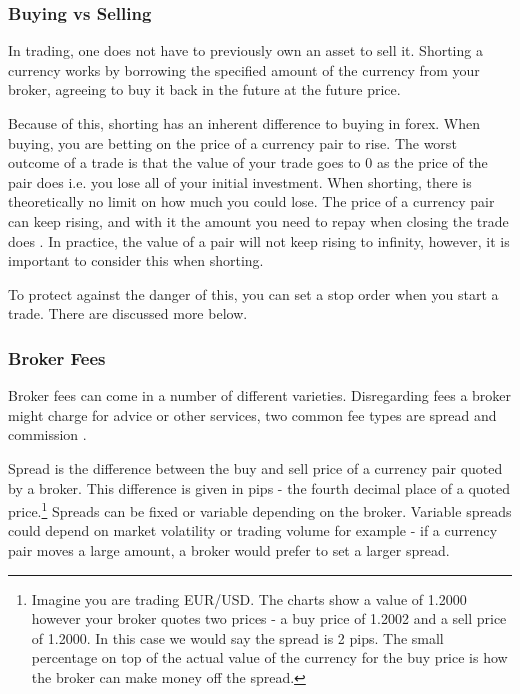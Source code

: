             
            \subsubsection{Buying vs Selling}
            In trading, one does not have to previously own an asset to sell it. Shorting a currency works by borrowing the specified amount of the currency from your broker, agreeing to buy it back in the future at the future price. 
            
            Because of this, shorting has an inherent difference to buying in forex. When buying, you are betting on the price of a currency pair to rise. The worst outcome of a trade is that the value of your trade goes to 0 as the price of the pair does i.e. you lose all of your initial investment. When shorting, there is theoretically no limit on how much you could lose. The price of a currency pair can keep rising, and with it the amount you need to repay when closing the trade does \cite{russell}. In practice, the value of a pair will not keep rising to infinity, however, it is important to consider this when shorting.

            To protect against the danger of this, you can set a stop order when you start a trade. There are discussed more below.
                

            
            \subsubsection{Broker Fees}
            
            Broker fees can come in a number of different varieties. Disregarding fees a broker might charge for advice or other services, two common fee types are spread and commission \cite{tradimo_cost}.
            
            Spread is the difference between the buy and sell price of a currency pair quoted by a broker. This difference is given in pips - the fourth decimal place of a quoted price.\footnote{Imagine you are trading EUR/USD. The charts show a value of 1.2000 however your broker quotes two prices - a buy price of 1.2002 and a sell price of 1.2000. In this case we would say the spread is 2 pips. The small percentage on top of the actual value of the currency for the buy price is how the broker can make money off the spread.} Spreads can be fixed or variable depending on the broker. Variable spreads could depend on market volatility or trading volume for example - if a currency pair moves a large amount, a broker would prefer to set a larger spread. 

